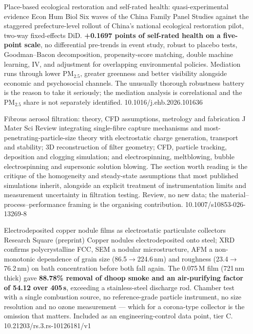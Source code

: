 \documentclass[10pt]{article}
\begin{document}
{Place-based ecological restoration and self-rated health: quasi-experimental evidence}
{Econ Hum Biol}
{Six waves of the China Family Panel Studies against the staggered prefecture-level
rollout of China's national ecological restoration pilot, two-way fixed-effects DiD.
\textbf{+0.1697 points of self-rated health on a five-point scale}, no differential
pre-trends in event study, robust to placebo tests, Goodman--Bacon decomposition,
propensity-score matching, double machine learning, IV, and adjustment for overlapping
environmental policies. Mediation runs through lower PM$_{2.5}$, greater greenness and
better visibility alongside economic and psychosocial channels. The unusually thorough
robustness battery is the reason to take it seriously; the mediation analysis is
correlational and the PM$_{2.5}$ share is not separately identified.}
{10.1016/j.ehb.2026.101636}

{Fibrous aerosol filtration: theory, CFD assumptions, metrology and fabrication}
{J Mater Sci}
{Review integrating single-fibre capture mechanisms and most-penetrating-particle-size
theory with electrostatic charge generation, transport and stability; 3D reconstruction of
filter geometry; CFD, particle tracking, deposition and clogging simulation; and
electrospinning, meltblowing, bubble electrospinning and supersonic solution blowing. The
section worth reading is the critique of the homogeneity and steady-state assumptions that
most published simulations inherit, alongside an explicit treatment of instrumentation
limits and measurement uncertainty in filtration testing. Review, no new data; the
material--process--performance framing is the organising contribution.}
{10.1007/s10853-026-13269-8}

{Electrodeposited copper nodule films as electrostatic particulate collectors}
{Research Square (preprint)}
{Copper nodules electrodeposited onto steel; XRD confirms polycrystalline FCC, SEM a
nodular microstructure, AFM a non-monotonic dependence of grain size (86.5$\to$224.6\,nm)
and roughness (23.4$\to$76.2\,nm) on bath concentration before both fall again. The
0.075\,M film (721\,nm thick) gave \textbf{88.78\% removal of dhoop smoke and an
air-purifying factor of 54.12 over 405\,s}, exceeding a stainless-steel discharge rod.
Chamber test with a single combustion source, no reference-grade particle instrument, no
size resolution and no ozone measurement --- which for a corona-type collector is the
omission that matters. Included as an engineering-control data point, tier C.}
{10.21203/rs.3.rs-10126181/v1}
\end{document}
